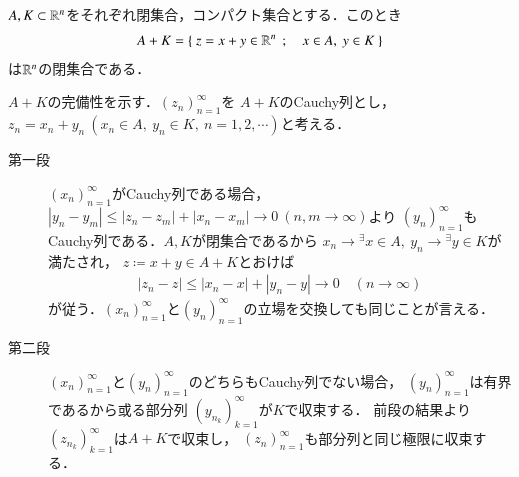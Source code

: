 	\begin{screen}
		\begin{lem}[閉集合とコンパクト集合の和は閉]\label{lem:combination_closed_compact}
			$A,K \subset \mathbb{R}^n$をそれぞれ閉集合，コンパクト集合とする．このとき
			\begin{align}
				A + K = \left\{\ z = x + y \in \mathbb{R}^n\ \, ; \quad x \in A,\ y \in K\ \right\}
			\end{align}
			は$\mathbb{R}^n$の閉集合である．
		\end{lem}
	\end{screen}
	
	\begin{prf}
		$A+K$の完備性を示す．$(z_n)_{n=1}^{\infty}$を
		$A+K$のCauchy列とし，$z_n = x_n + y_n\ (x_n \in A,\ y_n \in K,\ n=1,2,\cdots)$と考える．
		\begin{description}
			\item[第一段]
				$(x_n)_{n=1}^{\infty}$がCauchy列である場合，
				$|y_n - y_m| \leq |z_n - z_m| + |x_n - x_m| \longrightarrow 0\ (n,m \longrightarrow \infty)$より
				$(y_n)_{n=1}^{\infty}$もCauchy列である．$A,K$が閉集合であるから
				$x_n \longrightarrow {}^\exists x \in A,\ y_n \longrightarrow {}^\exists y \in K$が満たされ，
				$z \coloneqq x + y \in A + K$とおけば
				\begin{align}
					|z_n - z| \leq |x_n - x| + |y_n - y| \longrightarrow 0
					\quad (n \longrightarrow \infty)
				\end{align}
				が従う．$(x_n)_{n=1}^{\infty}$と$(y_n)_{n=1}^{\infty}$の立場を交換しても同じことが言える．
			
			\item[第二段]
				$(x_n)_{n=1}^{\infty}$と$(y_n)_{n=1}^{\infty}$のどちらもCauchy列でない場合，
				$(y_n)_{n=1}^{\infty}$は有界であるから或る部分列
				$(y_{n_k})_{k=1}^{\infty}$が$K$で収束する．
				前段の結果より$(z_{n_k})_{k=1}^{\infty}$は$A + K$で収束し，
				$(z_n)_{n=1}^{\infty}$も部分列と同じ極限に収束する．
				\QED
		\end{description}
	\end{prf}
	
